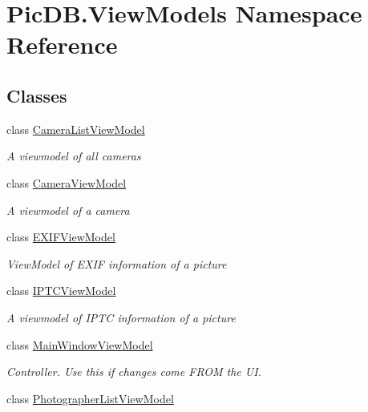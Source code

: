 \hypertarget{namespace_pic_d_b_1_1_view_models}{}\section{Pic\+D\+B.\+View\+Models Namespace Reference}
\label{namespace_pic_d_b_1_1_view_models}
\subsection*{Classes}
\begin{DoxyCompactItemize}
\item 
class \mbox{\hyperlink{class_pic_d_b_1_1_view_models_1_1_camera_list_view_model}{Camera\+List\+View\+Model}}
\begin{DoxyCompactList}\small\item\em A viewmodel of all cameras \end{DoxyCompactList}\item 
class \mbox{\hyperlink{class_pic_d_b_1_1_view_models_1_1_camera_view_model}{Camera\+View\+Model}}
\begin{DoxyCompactList}\small\item\em A viewmodel of a camera \end{DoxyCompactList}\item 
class \mbox{\hyperlink{class_pic_d_b_1_1_view_models_1_1_e_x_i_f_view_model}{E\+X\+I\+F\+View\+Model}}
\begin{DoxyCompactList}\small\item\em View\+Model of E\+X\+IF information of a picture \end{DoxyCompactList}\item 
class \mbox{\hyperlink{class_pic_d_b_1_1_view_models_1_1_i_p_t_c_view_model}{I\+P\+T\+C\+View\+Model}}
\begin{DoxyCompactList}\small\item\em A viewmodel of I\+P\+TC information of a picture \end{DoxyCompactList}\item 
class \mbox{\hyperlink{class_pic_d_b_1_1_view_models_1_1_main_window_view_model}{Main\+Window\+View\+Model}}
\begin{DoxyCompactList}\small\item\em Controller. Use this if changes come F\+R\+OM the UI. \end{DoxyCompactList}\item 
class \mbox{\hyperlink{class_pic_d_b_1_1_view_models_1_1_photographer_list_view_model}{Photographer\+List\+View\+Model}}

\end{DoxyCompactItemize}
